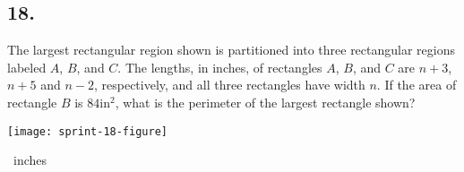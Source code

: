 \documentclass[12pt]{article}
\begin{document}
\begin{answer}
\newpage
\end{answer}

\subsection*{18.}
The largest rectangular region shown is partitioned into three rectangular regions labeled $A$, $B$, and $C$. The lengths, in inches, of rectangles $A$, $B$, and $C$ are $n+3$, $n+5$ and $n-2$, respectively, and all three rectangles have width $n$. If the area of rectangle $B$ is $84$in$^2$, what is the perimeter of the largest rectangle shown?

\begin{minipagex}[b]{\linewidth}
\centering
\texttt{[image: sprint-18-figure]}
\end{minipagex}

\nopagebreak

\fbox{\phantom{ANSWER}}~inches
\end{document}
